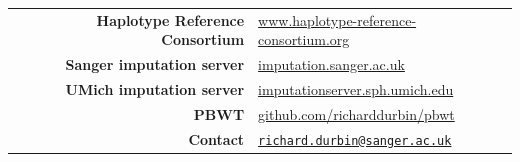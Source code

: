 \documentclass[a0,landscape]{a0poster}
\begin{document}
\begin{multicols}{3}

\vspace{-2cm}


\footnotesize
\setlength{\bibsep}{1pt}


\begin{center}\vspace{0.5cm}
{\normalsize
\def\arraystretch{1.25}
\setlength{\tabcolsep}{12pt}
\begin{tabular}{r l}
\toprule
\textbf{Haplotype Reference Consortium} & \url{www.haplotype-reference-consortium.org}\\
\textbf{Sanger imputation server} & \url{imputation.sanger.ac.uk}\\
\textbf{UMich imputation server} & \url{imputationserver.sph.umich.edu}\\
\textbf{PBWT} & \url{github.com/richarddurbin/pbwt}\\
\textbf{Contact} & \href{mailto:richard.durbin@sanger.ac.uk}{\nolinkurl{richard.durbin@sanger.ac.uk}}\\
\bottomrule
\end{tabular}
}
\end{center}\vspace{0.05cm}


\end{multicols}
\end{document}
